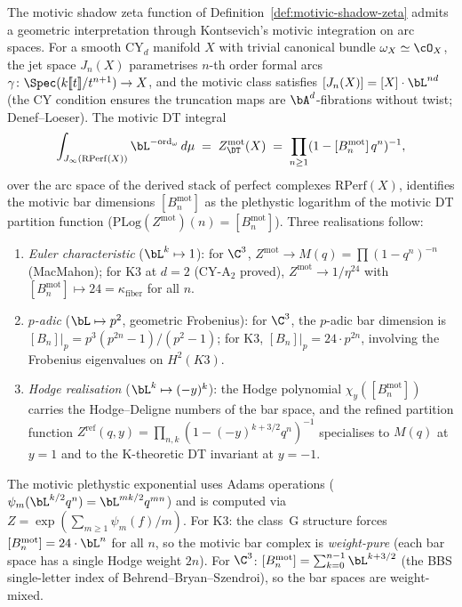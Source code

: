 \begin{remark}
\label{rem:motivic-integration-bar}
The motivic shadow zeta function of Definition~\ref{def:motivic-shadow-zeta} admits a geometric interpretation through Kontsevich's motivic integration on arc spaces. For a smooth CY$_d$ manifold $X$ with trivial canonical bundle $\omega_X \simeq \cO_X$, the jet space $J_n(X)$ parametrises $n$-th order formal arcs $\gamma \colon \Spec(k[\![t]\!]/t^{n+1}) \to X$, and the motivic class satisfies $[J_n(X)] = [X] \cdot \bL^{nd}$ (the CY condition ensures the truncation maps are $\bA^d$-fibrations without twist; Denef--Loeser). The motivic DT integral
\begin{equation}
\label{eq:motivic-dt-integral}
 \int_{J_\infty(\mathrm{RPerf}(X))} \bL^{-\mathrm{ord}_\omega}\, d\mu \;=\; Z^{\mathrm{mot}}_{\DT}(X) \;=\; \prod_{n \geq 1} (1 - [B_n^{\mathrm{mot}}]\, q^n)^{-1},
\end{equation}
over the arc space of the derived stack of perfect complexes $\mathrm{RPerf}(X)$, identifies the motivic bar dimensions $[B_n^{\mathrm{mot}}]$ as the plethystic logarithm of the motivic DT partition function ($\mathrm{PLog}(Z^{\mathrm{mot}})(n) = [B_n^{\mathrm{mot}}]$). Three realisations follow:
\begin{enumerate}[label=\textup{(\roman*)}]
 \item \emph{Euler characteristic} ($\bL^k \mapsto 1$): for $\C^3$, $Z^{\mathrm{mot}} \to M(q) = \prod (1-q^n)^{-n}$ (MacMahon); for K3 at $d = 2$ (CY-A$_2$ proved), $Z^{\mathrm{mot}} \to 1/\eta^{24}$ with $[B_n^{\mathrm{mot}}] \mapsto 24 = \kappa_{\mathrm{fiber}}$ for all $n$.
 \item \emph{$p$-adic} ($\bL \mapsto p^2$, geometric Frobenius): for $\C^3$, the $p$-adic bar dimension is $[B_n]|_{p} = p^3(p^{2n} - 1)/(p^2 - 1)$; for K3, $[B_n]|_p = 24 \cdot p^{2n}$, involving the Frobenius eigenvalues on $H^2(K3)$.
 \item \emph{Hodge realisation} ($\bL^k \mapsto (-y)^k$): the Hodge polynomial $\chi_y([B_n^{\mathrm{mot}}])$ carries the Hodge--Deligne numbers of the bar space, and the refined partition function $Z^{\mathrm{ref}}(q, y) = \prod_{n,k} (1 - (-y)^{k+3/2} q^n)^{-1}$ specialises to $M(q)$ at $y = 1$ and to the K-theoretic DT invariant at $y = -1$.
\end{enumerate}
The motivic plethystic exponential uses Adams operations ($\psi_m(\bL^{k/2} q^n) = \bL^{mk/2} q^{mn}$) and is computed via $Z = \exp(\sum_{m \geq 1} \psi_m(f)/m)$. For K3: the class~G structure forces $[B_n^{\mathrm{mot}}] = 24 \cdot \bL^n$ for all $n$, so the motivic bar complex is \emph{weight-pure} (each bar space has a single Hodge weight $2n$). For $\C^3$: $[B_n^{\mathrm{mot}}] = \sum_{k=0}^{n-1} \bL^{k+3/2}$ (the BBS single-letter index of Behrend--Bryan--Szendroi), so the bar spaces are weight-mixed.


\end{remark}
